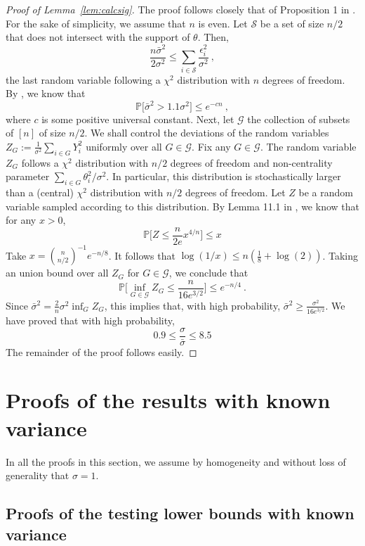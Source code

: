 \documentclass[twoside,11pt]{article}
\newcommand{\<}{\langle}
\renewcommand{\>}{\rangle}
\begin{document}
\begin{proof}[Proof of Lemma~\ref{lem:calcsig}]
The proof follows closely that of Proposition 1 in \cite{collier2016optimal}.
For the sake of simplicity, we assume that $n$ is even. Let $\mathcal S$ be a set of size $n/2$ that does not intersect with the support of $\theta$. Then, 
$$\frac{n\bar \sigma^2}{2\sigma^2}\leq  \sum_{i\in \mathcal{S}} \frac{\epsilon_i^2}{\sigma^2}\ ,$$
the last random variable following a $\chi^2$ distribution with $n$ degrees of freedom. By \cite{book_concentration}, we know that 
\[
 \mathbb{P}\big[\bar \sigma^2 > 1.1 \sigma^2\big]\leq e^{-c n}\ ,
\]
where $c$ is some positive universal constant. Next, let $\mathcal{G}$ the collection of subsets of $[n]$ of size $n/2$. We shall control the deviations of the random variables $Z_G:= \frac{1}{\sigma^2}\sum_{i\in G} Y_i^2$ uniformly over all $G\in \mathcal{G}$. Fix any $G\in \mathcal{G}$. The random variable $Z_G$ follows a $\chi^2$ distribution with $n/2$ degrees of freedom and non-centrality parameter $\sum_{i\in G}\theta_i^2/\sigma^2$. In particular, this distribution is stochastically larger than a (central) $\chi^2$ distribution with $n/2$ degrees of freedom. Let $Z$ be a random variable sampled according to this distribution. 
By Lemma 11.1 in \cite{MR2879672}, we know that for any $x>0$, 
\[
 \mathbb{P}\big[Z \leq \frac{n}{2e}x^{4/n}\big]\leq x
\]
Take $x= \binom{n}{n/2}^{-1}e^{- n/8}$. It follows that $\log(1/x)\leq n(\tfrac{1}{8}+ \log(2))$. Taking an union bound over all $Z_G$ for $G\in \mathcal{G}$, we conclude that 
\[
 \mathbb{P}\Big[\inf_{G\in \mathcal{G}}Z_G \leq \frac{n}{16e^{3/2}}\Big]\leq e^{-n/4}\ .
\]
 Since $\bar{\sigma}^2= \frac{2}{n}\sigma^2    \inf_G Z_G$, this implies that,  with high probability, $\bar{\sigma}^2\geq \frac{\sigma^2}{16e^{3/2}}$. We have proved that with high probability, 
 \[
  0.9 \leq \frac{\sigma}{\bar{\sigma}}\leq 8.5
 \]
The remainder of the proof follows easily.
\end{proof}







\section{Proofs of the results with known variance}
 
In all the proofs in this section, we assume by homogeneity and without loss of generality that $\sigma=1$. 
 
 \subsection{Proofs of the testing lower bounds with known variance}
\end{document}
